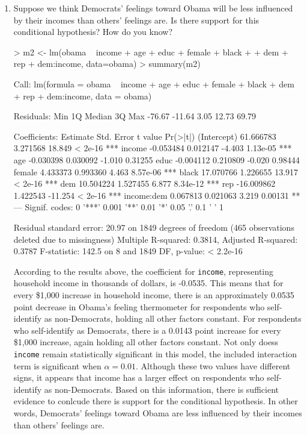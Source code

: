 \documentclass[12pt]{article}
\begin{document}
\begin{enumerate}
\item Suppose we think Democrats' feelings toward Obama will be less influenced by their incomes than others' feelings are.  Is there support for this conditional hypothesis?  How do you know?\\

\begin{Schunk}
\begin{Sinput}
> m2 <- lm(obama ~ income + age + educ + female + black 
+          + dem + rep + dem:income, data=obama)
> summary(m2)
\end{Sinput}
\begin{Soutput}
Call:
lm(formula = obama ~ income + age + educ + female + black + dem + 
    rep + dem:income, data = obama)

Residuals:
   Min     1Q Median     3Q    Max 
-76.67 -11.64   3.05  12.73  69.79 

Coefficients:
              Estimate Std. Error t value Pr(>|t|)    
(Intercept)  61.666783   3.271568  18.849  < 2e-16 ***
income       -0.053484   0.012147  -4.403 1.13e-05 ***
age          -0.030398   0.030092  -1.010  0.31255    
educ         -0.004112   0.210809  -0.020  0.98444    
female        4.433373   0.993360   4.463 8.57e-06 ***
black        17.070766   1.226655  13.917  < 2e-16 ***
dem          10.504224   1.527455   6.877 8.34e-12 ***
rep         -16.009862   1.422543 -11.254  < 2e-16 ***
income:dem    0.067813   0.021063   3.219  0.00131 ** 
---
Signif. codes:  0 '***' 0.001 '**' 0.01 '*' 0.05 '.' 0.1 ' ' 1

Residual standard error: 20.97 on 1849 degrees of freedom
  (465 observations deleted due to missingness)
Multiple R-squared:  0.3814,	Adjusted R-squared:  0.3787 
F-statistic: 142.5 on 8 and 1849 DF,  p-value: < 2.2e-16
\end{Soutput}
\end{Schunk}

According to the results above, the coefficient for \texttt{income}, representing household income in thousands of dollars, is -0.0535. This means that for every \$1,000 increase in household income, there is an approximately 0.0535 point decrease in Obama's feeling thermometer for respondents who self-identify as non-Democrats, holding all other factors constant. For respondents who self-identify as Democrats, there is a 0.0143 point increase for every \$1,000 increase, again holding all other factors constant. Not only doess \texttt{income} remain statistically significant in this model, the included interaction term is significant when $\alpha=0.01$. Although these two values have different signs, it appears that income has a larger effect on respondents who self-identify as non-Democrats. Based on this information, there is sufficient evidence to conlcude there is support for the conditional hypothesis. In other words, Democrats' feelings toward Obama are less influenced by their incomes than others' feelings are.


\end{enumerate}
\end{document}
